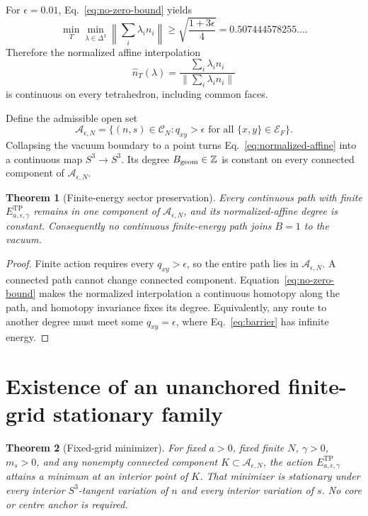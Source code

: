 \documentclass[11pt]{article}
\numberwithin{equation}{section}
\newtheorem{theorem}{Theorem}[section]
\theoremstyle{definition}
\theoremstyle{remark}
\newcommand{\ZZ}{\mathbb Z}
\newcommand{\cA}{\mathcal A}
\newcommand{\cC}{\mathcal C}
\newcommand{\cE}{\mathcal E}
\begin{document}
For \(\epsilon=0.01\), Eq.~\eqref{eq:no-zero-bound} yields
\begin{equation}
 \min_T\min_{\lambda\in\Delta^3}
 \left\lVert\sum_i\lambda_i n_i\right\rVert
 \ge\sqrt{\frac{1+3\epsilon}{4}}
 =0.507444578255\ldots.
 \label{eq:numerical-lower-bound}
\end{equation}
Therefore the normalized affine interpolation
\begin{equation}
 \widehat n_T(\lambda)
 =\frac{\sum_i\lambda_i n_i}
 {\lVert\sum_i\lambda_i n_i\rVert}
 \label{eq:normalized-affine}
\end{equation}
is continuous on every tetrahedron, including common faces.

Define the admissible open set
\begin{equation}
 \cA_{\epsilon,N}
 =\{(n,s)\in\cC_N:q_{xy}>\epsilon
 \text{ for all }\{x,y\}\in\cE_F\}.
 \label{eq:admissible-set}
\end{equation}
Collapsing the vacuum boundary to a point turns Eq.~\eqref{eq:normalized-affine}
into a continuous map \(S^3\to S^3\).  Its degree
\(B_{\rm geom}\in\ZZ\) is constant on every connected component of
\(\cA_{\epsilon,N}\).

\begin{theorem}[Finite-energy sector preservation]
Every continuous path with finite
\(E^{\mathrm{TP}}_{a,\epsilon,\gamma}\) remains in one component of
\(\cA_{\epsilon,N}\), and its normalized-affine degree is constant.
Consequently no continuous finite-energy path joins \(B=1\) to the vacuum.
\end{theorem}

\begin{proof}
Finite action requires every \(q_{xy}>\epsilon\), so the entire path lies in
\(\cA_{\epsilon,N}\).  A connected path cannot change connected component.
Equation~\eqref{eq:no-zero-bound} makes the normalized interpolation a
continuous homotopy along the path, and homotopy invariance fixes its degree.
Equivalently, any route to another degree must meet some
\(q_{xy}=\epsilon\), where Eq.~\eqref{eq:barrier} has infinite energy.
\end{proof}

\section{Existence of an unanchored finite-grid stationary family}

\begin{theorem}[Fixed-grid minimizer]
For fixed \(a>0\), fixed finite \(N\), \(\gamma>0\), \(m_s>0\), and any
nonempty connected component \(K\subset\cA_{\epsilon,N}\), the action
\(E^{\mathrm{TP}}_{a,\epsilon,\gamma}\) attains a minimum at an interior
point of \(K\).  That minimizer is stationary under every interior
\(S^3\)-tangent variation of \(n\) and every interior variation of \(s\).
No core or centre anchor is required.
\end{theorem}
\end{document}
